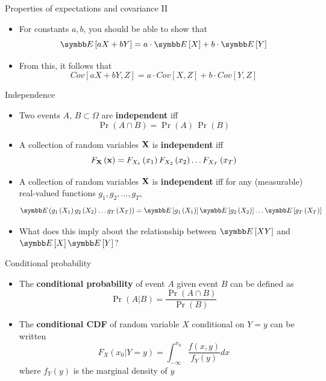 \documentclass[aspectratio=169,11pt]{beamer}
\begin{document}
\begin{frame}{Properties of expectations and covariance II}
\begin{itemize}
	\item For constants $a,b$, you should be able to show that\[
		\E\left[ a X + b Y\right] = a  \cdot \E\left[ X\right] + b \cdot \E\left[ Y\right] 
	\]

	\medskip
	\item From this, it follows that\[
		Cov\left[ a X + b Y, Z \right] = a \cdot Cov\left[X , Z\right] + b \cdot Cov\left[Y , Z\right] 
	\]
\end{itemize}
\end{frame}



\begin{frame}{Independence}
\begin{itemize}
	\item Two events $A$, $B \subset \Omega$  are {\bf independent} iff\[
		\Pr\left(A\cap B\right) = \Pr\left( A\right)\, \Pr\left( B\right)
	\]
	
	\medskip
	\item A collection of random variables ${\bf X}$ is {\bf independent} iff\[
		F_{{\bf X}} \left({\bf x}\right) = F_{X_1}\left(x_1\right) F_{X_2}\left(x_2\right) \dots F_{X_T}\left(x_T\right) 
	\]
	
		\medskip
	\item A collection of random variables ${\bf X}$ is {\bf independent} iff for any (measurable) real-valued functions $g_1,g_2,\dots,g_T$, \[
		\E \left(g_1\left(X_1\right)g_2\left(X_2\right)\dots g_T\left(X_T\right)\right) = \E\left[g_1\left(X_1\right)\right] \E\left[g_2\left(X_2\right)\right] \dots \E\left[g_T\left(X_T\right)\right]
	\]
	
	
	\medskip
	\item What does this imply about the relationship between $\E\left[X Y\right]$ and $\E\left[X\right] \E\left[Y\right]$? 
			
\end{itemize}
\end{frame}


\begin{frame}{Conditional probability}
\begin{itemize}
	\item The {\bf conditional probability} of event $A$ given event $B$ can be defined as\[
			\Pr\left(A|B\right) = \frac{\Pr\left(A \cap B\right)}{\Pr(B)}
	\]
	

	
	\item The {\bf conditional CDF} of random variable $X$ conditional on $Y=y$ can be written\[
			F_{X} \left(x_0 |Y=y\right) = \int_{-\infty}^{x_0} \frac{f\left(x,y\right)}{f_{Y}\left(y\right)}dx
	\]
	where $f_{Y}\left(y\right)$ is the marginal density of $y$
	

\end{itemize}
\end{frame}
\end{document}
